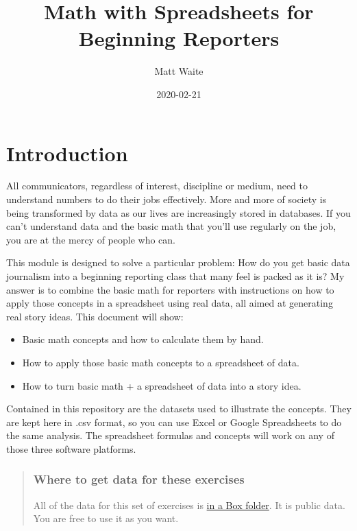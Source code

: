 \documentclass[]{book}
\title{Math with Spreadsheets for Beginning Reporters}
\author{Matt Waite}
\date{2020-02-21}
\providecommand{\tightlist}{%
  \setlength{\itemsep}{0pt}\setlength{\parskip}{0pt}}
\begin{document}
\maketitle

{
\setcounter{tocdepth}{1}
\tableofcontents
}
\hypertarget{introduction}{%
\chapter{Introduction}\label{introduction}}

All communicators, regardless of interest, discipline or medium, need to understand numbers to do their jobs effectively. More and more of society is being transformed by data as our lives are increasingly stored in databases. If you can't understand data and the basic math that you'll use regularly on the job, you are at the mercy of people who can.

This module is designed to solve a particular problem: How do you get basic data journalism into a beginning reporting class that many feel is packed as it is? My answer is to combine the basic math for reporters with instructions on how to apply those concepts in a spreadsheet using real data, all aimed at generating real story ideas. This document will show:

\begin{itemize}
\tightlist
\item
  Basic math concepts and how to calculate them by hand.
\item
  How to apply those basic math concepts to a spreadsheet of data.
\item
  How to turn basic math + a spreadsheet of data into a story idea.
\end{itemize}

Contained in this repository are the datasets used to illustrate the concepts. They are kept here in .csv format, so you can use Excel or Google Spreadsheets to do the same analysis. The spreadsheet formulas and concepts will work on any of those three software platforms.

\begin{quote}
\hypertarget{where-to-get-data-for-these-exercises}{%
\subsection{Where to get data for these exercises}\label{where-to-get-data-for-these-exercises}}

All of the data for this set of exercises is \href{https://unl.box.com/s/y9w4y8x79649wofnp7g13oavnjtxmfic}{in a Box folder}. It is public data. You are free to use it as you want.
\end{quote}
\end{document}
